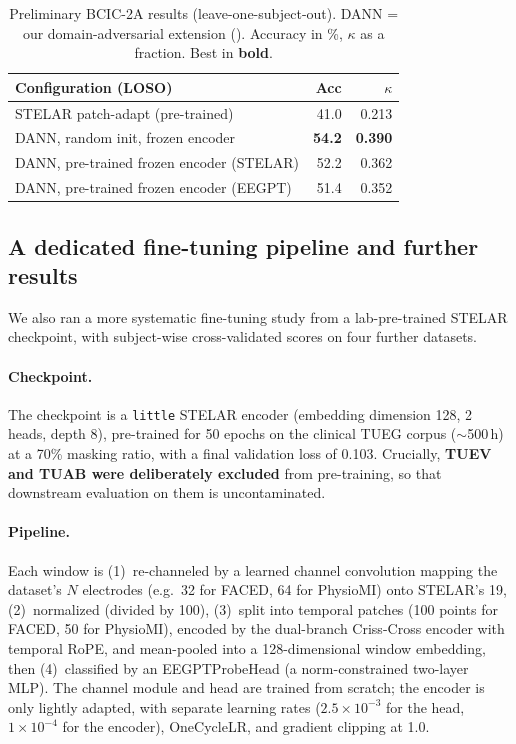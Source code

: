 \documentclass[11pt]{article}
\begin{document}
\begin{table}[t]
\centering
\caption{Preliminary BCIC-2A results (leave-one-subject-out). DANN = our
domain-adversarial extension (). Accuracy in \%, $\kappa$ as a
fraction. Best in \textbf{bold}.}
\label{tab:bcic}
\small
\begin{tabular}{lrr}
\toprule
Configuration (LOSO) & Acc & $\kappa$ \\
\midrule
STELAR patch-adapt (pre-trained)           & 41.0 & 0.213 \\
DANN, random init, frozen encoder          & \textbf{54.2} & \textbf{0.390} \\
DANN, pre-trained frozen encoder (STELAR)  & 52.2 & 0.362 \\
DANN, pre-trained frozen encoder (EEGPT)   & 51.4 & 0.352 \\
\bottomrule
\end{tabular}
\end{table}

\subsection{A dedicated fine-tuning pipeline and further results}
\label{sec:ft-pipeline}

We also ran a more systematic fine-tuning study from a lab-pre-trained STELAR
checkpoint, with subject-wise cross-validated scores on four further datasets.

\paragraph{Checkpoint.} The checkpoint is a \texttt{little} STELAR encoder
(embedding dimension 128, 2 heads, depth 8), pre-trained for 50 epochs on the
clinical TUEG corpus ($\sim$500\,h) at a 70\% masking ratio, with a final
validation loss of 0.103. Crucially, \textbf{TUEV and TUAB were deliberately
excluded} from pre-training, so that downstream evaluation on them is uncontaminated.

\paragraph{Pipeline.} Each window is (1)~re-channeled by a learned channel
convolution mapping the dataset's $N$ electrodes (e.g.\ 32 for FACED, 64 for
PhysioMI) onto STELAR's 19, (2)~normalized (divided by 100), (3)~split into
temporal patches (100 points for FACED, 50 for PhysioMI), encoded by the
dual-branch Criss-Cross encoder with temporal RoPE, and mean-pooled into a
128-dimensional window embedding, then (4)~classified by an EEGPTProbeHead (a
norm-constrained two-layer MLP). The channel module and head are trained from
scratch; the encoder is only lightly adapted, with separate learning rates
($2.5\times10^{-3}$ for the head, $1\times10^{-4}$ for the encoder), OneCycleLR,
and gradient clipping at 1.0.
\end{document}
